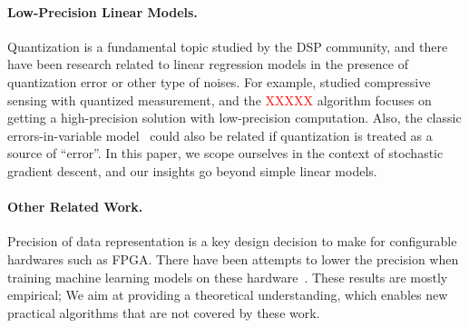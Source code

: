\documentclass{article}
\begin{document}
\vspace{-1em}
\paragraph{Low-Precision Linear Models.}

Quantization is a fundamental topic studied by the
DSP community, and there have been research related to
linear regression models in the presence of quantization
error or other type of noises. For example,
\citet{Gopi:2013:ICML} studied compressive sensing
with quantized measurement, and the \textcolor{red}{XXXXX}
algorithm focuses on getting a high-precision solution
with low-precision computation. Also, the
classic errors-in-variable model~\cite{Hall:2008:Book}
could also be related if quantization is treated 
as a source of ``error''. In this paper, we scope
ourselves in the context of stochastic gradient descent, 
and our insights go beyond simple linear models.

\vspace{-1em}
\paragraph{Other Related Work.} Precision of data
representation is a key design decision to make
for configurable hardwares such as FPGA. There have
been attempts to
lower the precision when training machine learning models
on these hardware~\cite{Kim:2011:ICASSP}. 
These results are mostly empirical; We
aim at providing a theoretical understanding, which 
enables new practical algorithms that are not covered 
by these work.



\cleardoublepage



\end{document}
